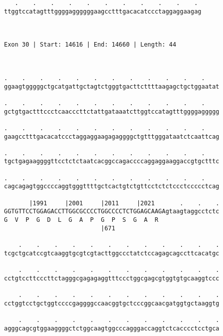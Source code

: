 \documentclass{article}
\begin{document}
\begin{Verbatim}
   .    .    .    .    .    .    .    .    .    .    . 
ttggtccatagtttggggaggggggaagcctttgacacatccctaggaggaagag
                                                       
                                                       
 
Exon 30 | Start: 14616 | End: 14660 | Length: 44



.    .    .    .    .    .    .    .    .    .    .    .    
ggaagtgggggctgcatgattgctagtctgggtgacttcttttaagagctgctggaatat
                                                            
.    .    .    .    .    .    .    .    .    .    .    .    
gctgtgactttccctcaacccttctattgataaatcttggtccatagtttggggaggggg
                                                            
.    .    .    .    .    .    .    .    .    .    .    .    
gaagcctttgacacatccctaggaggaagagaggggctgtttgggataatctcaattcag
                                                            
.    .    .    .    .    .    .    .    .    .    .    .    
tgctgagaaggggttcctctctaatcacggccagaccccaggaggaaggaccgtgctttc
                                                            
.    .    .    .    .    .    .    .    .    .    .    .    
cagcagagtggccccaggtgggttttgctcactgtctgttcctctctccctccccctcag
                                                            
       |1991     |2001     |2011     |2021       .    .    .
GGTGTTCCTGGAGACCTTGGCGCCCCTGGCCCCTCTGGAGCAAGAgtaagtaggcctctc
G  V  P  G  D  L  G  A  P  G  P  S  G  A  R                 
                           |671                             
  
    .    .    .    .    .    .    .    .    .    .    .    .
tcgctgcatccgtcaaggtgcgtcgtacttggccctatctccagagcagccttcacatgc
                                                            
    .    .    .    .    .    .    .    .    .    .    .    .
cctgtccttcccttctagggcgagagaggtttccctggcgagcgtggtgtgcaaggtccc
                                                            
    .    .    .    .    .    .    .    .    .    .    .    .
cctggtcctgctggtccccgaggggccaacggtgctcccggcaacgatggtgctaaggtg
                                                            
    .    .    .    .    .    .    .    .    .    .    .    .
agggcagcgtggaaggggctctggcaagtggcccagggaccaggtctcacccctcctgca
                                                            

\end{Verbatim}
\end{document}

